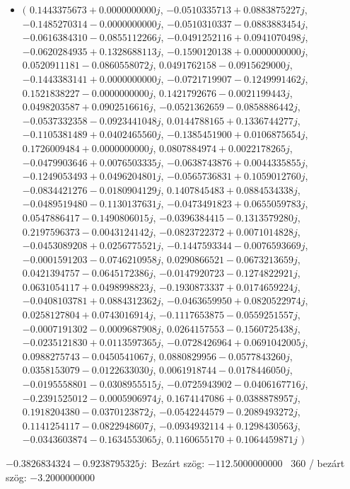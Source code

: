 \documentclass[14pt,a4paper]{article}
\begin{document}
\begin{itemize}
\item
$\big($
$0.1443375673+0.0000000000j$, $-0.0510335713+0.0883875227j$, $-0.1485270314-0.0000000000j$, $-0.0510310337-0.0883883454j$, $-0.0616384310-0.0855112266j$, $-0.0491252116+0.0941070498j$, $-0.0620284935+0.1328688113j$, $-0.1590120138+0.0000000000j$, $0.0520911181-0.0860558072j$, $0.0491762158-0.0915629000j$, $-0.1443383141+0.0000000000j$, $-0.0721719907-0.1249991462j$, $0.1521838227-0.0000000000j$, $0.1421792676-0.0021199443j$, $0.0498203587+0.0902516616j$, $-0.0521362659-0.0858886442j$, $-0.0537332358-0.0923441048j$, $0.0144788165+0.1336744277j$, $-0.1105381489+0.0402465560j$, $-0.1385451900+0.0106875654j$, $0.1726009484+0.0000000000j$, $0.0807884974+0.0022178265j$, $-0.0479903646+0.0076503335j$, $-0.0638743876+0.0044335855j$, $-0.1249053493+0.0496204801j$, $-0.0565736831+0.1059012760j$, $-0.0834421276-0.0180904129j$, $0.1407845483+0.0884534338j$, $-0.0489519480-0.1130137631j$, $-0.0473491823+0.0655059783j$, $0.0547886417-0.1490806015j$, $-0.0396384415-0.1313579280j$, $0.2197596373-0.0043124142j$, $-0.0823722372+0.0071014828j$, $-0.0453089208+0.0256775521j$, $-0.1447593344-0.0076593669j$, $-0.0001591203-0.0746210958j$, $0.0290866521-0.0673213659j$, $0.0421394757-0.0645172386j$, $-0.0147920723-0.1274822921j$, $0.0631054117+0.0498998823j$, $-0.1930873337+0.0174659224j$, $-0.0408103781+0.0884312362j$, $-0.0463659950+0.0820522974j$, $0.0258127804+0.0743016914j$, $-0.1117653875-0.0559251557j$, $-0.0007191302-0.0009687908j$, $0.0264157553-0.1560725438j$, $-0.0235121830+0.0113597365j$, $-0.0728426964+0.0691042005j$, $0.0988275743-0.0450541067j$, $0.0880829956-0.0577843260j$, $0.0358153079-0.0122633030j$, $0.0061918744-0.0178446050j$, $-0.0195558801-0.0308955515j$, $-0.0725943902-0.0406167716j$, $-0.2391525012-0.0005906974j$, $0.1674147086+0.0388878957j$, $0.1918204380-0.0370123872j$, $-0.0542244579-0.2089493272j$, $0.1141254117-0.0822948607j$, $-0.0934932114+0.1298430563j$, $-0.0343603874-0.1634553065j$, $0.1160655170+0.1064459871j$
$\big)$
\end{itemize}
$-0.3826834324-0.9238795325j$:\
Bezárt szög: $-112.5000000000$ \
360 / bezárt szög: $-3.2000000000$\
\end{document}
